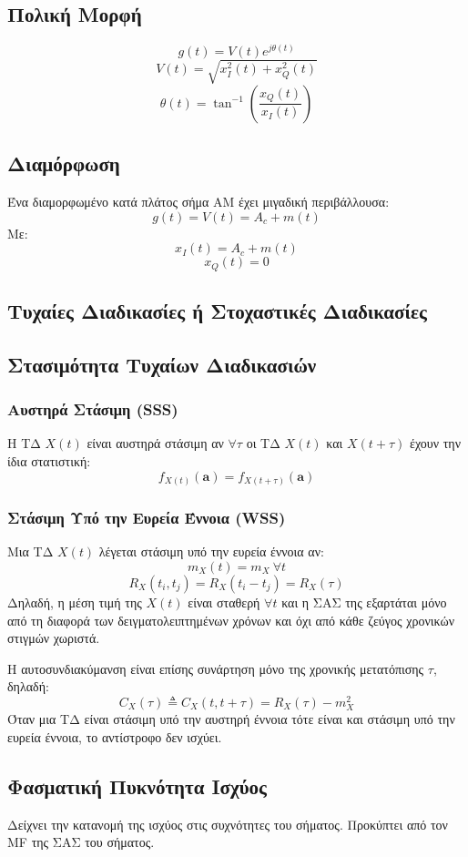 \documentclass[a4paper,12pt]{article}
\begin{document}
\subsection*{Πολική Μορφή}
\[
g(t)=V(t)e^{j\theta(t)}
\]
\[
V(t)=\sqrt{x_I^2(t)+x_Q^2(t)}
\]
\[
\theta(t)=\tan^{-1}\left(\frac{x_Q(t)}{x_I(t)}\right)
\]

\subsection*{Διαμόρφωση}
Ένα διαμορφωμένο κατά πλάτος σήμα AM έχει μιγαδική περιβάλλουσα:
\[
g(t)=V(t)=A_c+m(t)
\]
Με:
\[
x_I(t)=A_c+m(t)
\]
\[
x_Q(t)=0
\]

\subsection*{Τυχαίες Διαδικασίες ή Στοχαστικές Διαδικασίες}

\subsection*{Στασιμότητα Τυχαίων Διαδικασιών}
\subsubsection*{Αυστηρά Στάσιμη (SSS)}
Η ΤΔ \(X(t)\) είναι αυστηρά στάσιμη αν \(\forall \tau\) οι ΤΔ \(X(t)\) και \(X(t+\tau)\) έχουν την ίδια στατιστική:
\[
f_{X(t)}(\mathbf{a})=f_{X(t+\tau)}(\mathbf{a})
\]

\subsubsection*{Στάσιμη Υπό την Ευρεία Έννοια (WSS)}
Μια ΤΔ \(X(t)\) λέγεται στάσιμη υπό την ευρεία έννοια αν:
\[
m_X(t)=m_X \ \forall t
\]
\[
R_X(t_i,t_j)=R_X(t_i-t_j)=R_X(\tau)
\]
Δηλαδή, η μέση τιμή της \(X(t)\) είναι σταθερή \(\forall t\) και η ΣΑΣ της εξαρτάται μόνο από τη διαφορά των δειγματολειπτημένων χρόνων και όχι από κάθε ζεύγος χρονικών στιγμών χωριστά.

Η αυτοσυνδιακύμανση είναι επίσης συνάρτηση μόνο της χρονικής μετατόπισης \(\tau\), δηλαδή:
\[
C_X(\tau)\triangleq C_X(t,t+\tau)=R_X(\tau)-m_X^2
\]
Όταν μια ΤΔ είναι στάσιμη υπό την αυστηρή έννοια τότε είναι και στάσιμη υπό την ευρεία έννοια, το αντίστροφο δεν ισχύει.

\subsection*{Φασματική Πυκνότητα Ισχύος}
Δείχνει την κατανομή της ισχύος στις συχνότητες του σήματος. Προκύπτει από τον MF της ΣΑΣ του σήματος.
\end{document}

